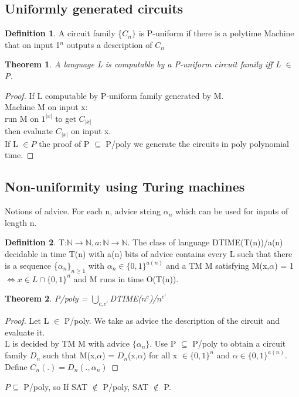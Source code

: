 \documentclass{article}
\newtheorem{theorem}{Theorem}
\theoremstyle{definition}
\newtheorem{definition}{Definition}
\theoremstyle{remark}
\newcommand{\N}{\mathbb{N}}
\begin{document}
\subsection{Uniformly generated circuits}
\begin{definition}
	A circuit family \{$C_n\}$ is P-uniform if there is a polytime Machine that on input 1$^n$ outputs a description of $C_n$
\end{definition}

\begin{theorem}
	A language L is computable by a P-uniform circuit family iff L $\in$ P.
\end{theorem}

\begin{proof}
	If L computable by P-uniform family generated by M.\\
	Machine M on input x:\\
	\indent run M on $1^{|x|}$ to get $C_{|x|}$\\
	\indent then evaluate $C_{|x|}$ on input x.\\
	
	If L $\in P$ the proof of P $\subseteq$ P/poly we generate the circuits in poly polynomial time.
\end{proof}

\subsection{Non-uniformity using Turing machines}
Notions of advice. For each n, advice string $\alpha_n$ which can be used for inputs of length n.
\begin{definition}
	T:$\N \rightarrow \N, a:\N \rightarrow\N$. The class of language DTIME(T(n))/a(n) decidable in time T(n) with a(n) bits of advice contains every L such that there is a sequence \{$\alpha_n\}_{n\geq 1}$ with $\alpha_n \in \{0,1\}^{a(n)}$ and a TM M satisfying M(x,$\alpha$) = 1 $\Leftrightarrow x \in L \cap \{0,1\}^n$ and M runs in time O(T(n)).
\end{definition}

\begin{theorem}
	P/poly = $\bigcup\limits_{c,c'}$DTIME($n^c$)/$n^{c'}$
\end{theorem}

\begin{proof}
	Let L $\in$ P/poly. We take as advice the description of the circuit and evaluate it.\\
	
	L is decided by TM M with advice $\{\alpha_n\}$. Use P $\subseteq$ P/poly to obtain a circuit family $D_n$ such that M(x,$\alpha$) = $D_n$(x,$\alpha$) for all x $\in \{0,1\}^n$ and $\alpha\in\{0,1\}^{a(n)}$. Define $C_n(.) = D_n(.,\alpha_n)$
\end{proof}
$P \subseteq$ P/poly, so If SAT $\notin$ P/poly, SAT $\notin$ P.
\end{document}
